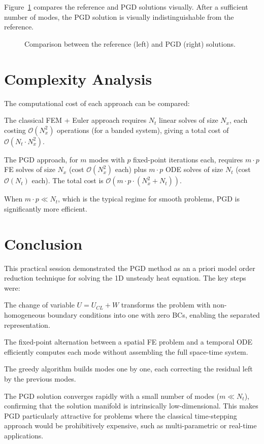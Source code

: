\documentclass[11pt,a4paper]{article}
\begin{document}
Figure~\ref{fig:pgd_ref} compares the reference and PGD solutions visually. After a sufficient number of modes, the PGD solution is visually indistinguishable from the reference.

\begin{figure}[H]
    \centering
    \caption{Comparison between the reference (left) and PGD (right) solutions.}
    \label{fig:pgd_ref}
\end{figure}

\section{Complexity Analysis}

The computational cost of each approach can be compared:

The classical FEM + Euler approach requires $N_t$ linear solves of size $N_x$, each costing $\mathcal{O}(N_x^2)$ operations (for a banded system), giving a total cost of $\mathcal{O}(N_t \cdot N_x^2)$.

The PGD approach, for $m$ modes with $p$ fixed-point iterations each, requires $m \cdot p$ FE solves of size $N_x$ (cost $\mathcal{O}(N_x^2)$ each) plus $m \cdot p$ ODE solves of size $N_t$ (cost $\mathcal{O}(N_t)$ each). The total cost is $\mathcal{O}(m \cdot p \cdot (N_x^2 + N_t))$.

When $m \cdot p \ll N_t$, which is the typical regime for smooth problems, PGD is significantly more efficient.

\section{Conclusion}

This practical session demonstrated the PGD method as an a priori model order reduction technique for solving the 1D unsteady heat equation. The key steps were:

The change of variable $U = U_{CL} + W$ transforms the problem with non-homogeneous boundary conditions into one with zero BCs, enabling the separated representation.

The fixed-point alternation between a spatial FE problem and a temporal ODE efficiently computes each mode without assembling the full space-time system.

The greedy algorithm builds modes one by one, each correcting the residual left by the previous modes.

The PGD solution converges rapidly with a small number of modes ($m \ll N_t$), confirming that the solution manifold is intrinsically low-dimensional. This makes PGD particularly attractive for problems where the classical time-stepping approach would be prohibitively expensive, such as multi-parametric or real-time applications.
\end{document}
